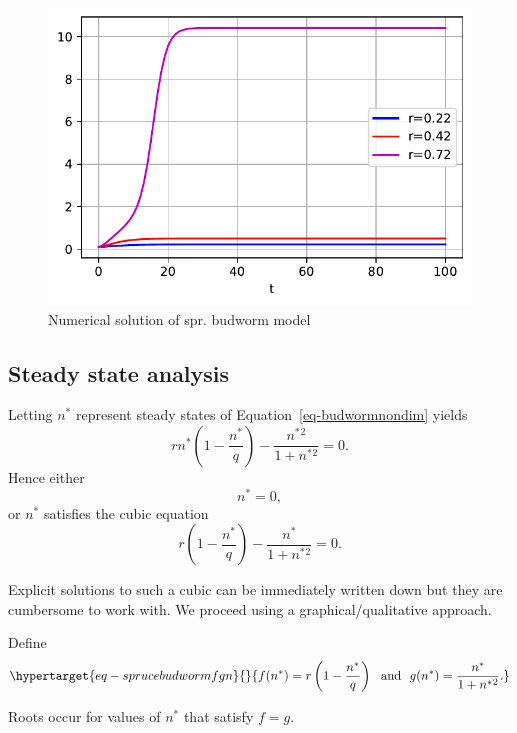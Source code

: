 \documentclass[
  letterpaper,
  DIV=11,
  numbers=noendperiod]{scrreprt}
\begin{document}
\begin{figure}

{\centering \includegraphics{SinglePopODEMOdels_files/figure-pdf/fig-sprucebudworm-numsol-output-1.pdf}

}

\caption{\label{fig-sprucebudworm-numsol}Numerical solution of spr.
budworm model}

\end{figure}

\hypertarget{steady-state-analysis}{%
\subsection{Steady state analysis}\label{steady-state-analysis}}

Letting \(n^*\) represent steady states of
Equation~\ref{eq-budwormnondim} yields \[
rn^*(1-\frac{n^*}{q})- \frac{n^*{^2}}{1+n^*{^2}}=0.
\] Hence either \[
n^*=0,
\] or \(n^*\) satisfies the cubic equation \[
r\left(1-\frac{n^*}{q}\right)- \frac{n^*}{1+n^*{^2}}=0.
\]

Explicit solutions to such a cubic can be immediately written down but
they are cumbersome to work with. We proceed using a
graphical/qualitative approach.

Define \begin{equation}\protect\hypertarget{eq-sprucebudwormfgn}{}{
f(n^*)=r\left(1-\frac{n^*}{q}\right) \ \ \textrm{and} \ \ g(n^*)=\frac{n^*}{1+n^*{^2}}.
}\label{eq-sprucebudwormfgn}\end{equation}

Roots occur for values of \(n^*\) that satisfy \(f=g\).
\end{document}
